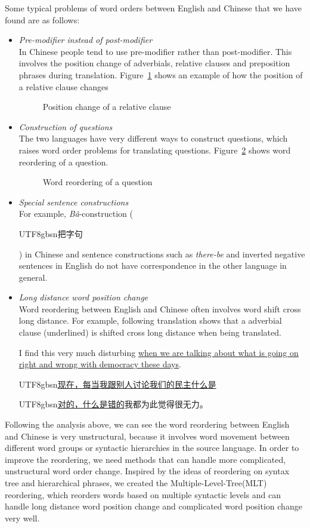 \documentclass[a4paper]{article}
\newcommand{\cntext}[1]{\begin{CJK}{UTF8}{gbsn}#1\end{CJK}}
\begin{document}
Some typical problems of word orders between English and Chinese that we have found are as follows:

\begin{itemize}
\item \emph{Pre-modifier instead of post-modifier}\\ In Chinese people tend to use pre-modifier rather than post-modifier. This involves the position change of adverbials, relative clauses and preposition phrases during translation. Figure~\ref{relative} shows an example of how the position of a relative clause changes
\begin{figure}

\caption{Position change of a relative clause}
\label{relative}
\end{figure}
\item \emph{Construction of questions}\\
The two languages have very different ways to construct questions, which raises word order problems for translating questions. Figure~\ref{question} shows word reordering of a question.
\begin{figure}

\caption{Word reordering of a question}
\label{question}
\end{figure}
\item \emph{Special sentence constructions}\\ For example, \emph{B\^{a}}-construction (\cntext{把字句}) in Chinese and sentence constructions such as \emph{there-be} and inverted negative sentences in English do not have correspondence in the other language in general.
\item \emph{Long distance word position change}\\
Word reordering between English and Chinese often involves word shift cross long distance. For example, following translation shows that a adverbial clause (underlined) is shifted cross long distance when being translated.\bigskip \\
\parbox{0.3705\textwidth}{
I find this very much disturbing \uline{when we are talking about what is going on right and wrong with democracy these days}.\medskip\\
\cntext{\uline{现在，每当我跟别人讨论我们的民主什么是}}
\cntext{\uline{对的，什么是错的}我都为此觉得很无力。}
}
\end{itemize}

Following the analysis above, we can see the word reordering between English and Chinese is very unstructural, because it involves word movement between different word groups or syntactic hierarchies in the source language. In order to improve the reordering, we need methods that can handle more complicated, unstructural word order change. Inspired by the ideas of reordering on syntax tree and hierarchical phrases, we created the Multiple-Level-Tree(MLT) reordering, which reorders words based on multiple syntactic levels and can handle long distance word position change and complicated word position change very well.
\end{document}

